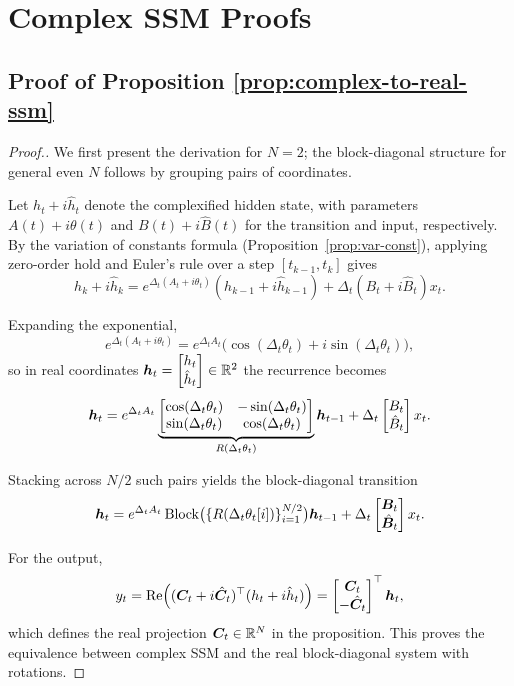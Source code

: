 \section{Complex SSM Proofs}
\subsection{Proof of Proposition \ref{prop:complex-to-real-ssm}}
\label{app:proof-complex-to-real-ssm}
\PropComplexRealSSM*
\begin{proof}[Proof.]
We first present the derivation for $N=2$; the block-diagonal structure for general even $N$ follows by grouping pairs of coordinates.

Let $h_t + i\hat{h}_t$ denote the complexified hidden state, with parameters 
$A(t)+i\theta(t)$ and $B(t)+i\hat{B}(t)$ for the transition and input, respectively.  
By the variation of constants formula (Proposition~\ref{prop:var-const}), applying zero-order hold and Euler's rule over a step $[t_{k-1},t_k]$ gives
\[
h_k + i\hat{h}_k 
= e^{\Delta_t (A_t + i\theta_t)}(h_{k-1}+ i\hat{h}_{k-1})
+ \Delta_t (B_t + i\hat{B}_t)x_t.
\]

Expanding the exponential,
\[
e^{\Delta_t(A_t+i\theta_t)} 
= e^{\Delta_t A_t}\Big(\cos(\Delta_t\theta_t)+i\sin(\Delta_t\theta_t)\Big),
\]
so in real coordinates ${\bm{h}}_t=\begin{bmatrix}h_t \\ \hat{h}_t\end{bmatrix}\in\mathbb{R}^2$ the recurrence becomes
\[
{\bm{h}}_t
= e^{\Delta_t A_t}
\underbrace{\begin{bmatrix}
    \cos(\Delta_t\theta_t) & -\sin(\Delta_t\theta_t) \\
    \sin(\Delta_t\theta_t) & \cos(\Delta_t\theta_t)
\end{bmatrix}}_{R(\Delta_t\theta_t)}
{\bm{h}}_{t-1}
+ \Delta_t
\begin{bmatrix}
B_t \\ \hat{B}_t
\end{bmatrix}x_t.
\]

Stacking across $N/2$ such pairs yields the block-diagonal transition
\[
{\bm{h}}_t
= e^{\Delta_t A_t}\,\mathrm{Block}\big(\{R(\Delta_t\theta_t[i])\}_{i=1}^{N/2}\big){\bm{h}}_{t-1}
+ \Delta_t\begin{bmatrix}{\bm{B}}_t \\ \hat{{\bm{B}}}_t\end{bmatrix}x_t.
\]

For the output, 
\[
y_t = \mathrm{Re}\Big(({\bm{C}}_t+i\hat{{\bm{C}}}_t)^\top(h_t+i\hat{h}_t)\Big)
= \begin{bmatrix}{\bm{C}}_t \\ -\hat{{\bm{C}}}_t\end{bmatrix}^\top {\bm{h}}_t,
\]
which defines the real projection ${\bm{C}}_t\in\mathbb{R}^N$ in the proposition.
This proves the equivalence between complex SSM and the real block-diagonal system with rotations.
\end{proof}

